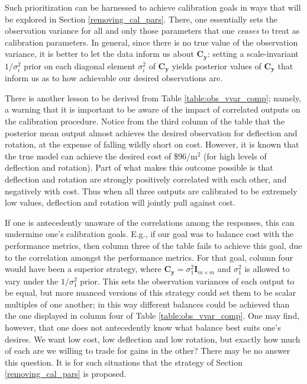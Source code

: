 \documentclass{article}
\begin{document}
Such prioritization can be harnessed to achieve calibration goals in ways that will be explored in Section \ref{removing_cal_pars}. There, one essentially sets the observation variance for all and only those parameters that one \emph{ceases} to treat as calibration parameters. In general, since there is no true value of the observation variance, it is better to let the data inform us about $\mathbf C_{\mathbf y}$: setting a scale-invariant $1/\sigma_i^2$ prior on each diagonal element $\sigma_i^2$ of $\mathbf C_{\mathbf y}$ yields posterior values of $\mathbf C_{\mathbf y}$ that inform us as to how achievable our desired observations are.

There is another lesson to be derived from Table \ref{table:obs_vvar_comp}; namely, a warning that it is important to be aware of the impact of correlated outputs on the calibration procedure. Notice from the third column of the table that the posterior mean output almost achieves the desired observation for deflection and rotation, at the expense of falling wildly short on cost. However, it is known that the true model can achieve the desired cost of \$96/m$^2$ (for high levels of deflection and rotation). Part of what makes this outcome possible is that deflection and rotation are strongly positively correlated with each other, and negatively with cost. Thus when all three outputs are calibrated to be extremely low values, deflection and rotation will jointly pull against cost.

If one is antecedently unaware of the correlations among the responses, this can undermine one's calibration goals. E.g., if our goal was to balance cost with the performance metrics, then column three of the table fails to achieve this goal, due to the correlation amongst the performance metrics. For that goal, column four would have been a superior strategy, where $\mathbf C_{\mathbf y} = \sigma^2_1 \mathbf I_{m\times m}$ and $\sigma^2_1$ is allowed to vary under the $1/\sigma^2_1$ prior. This sets the observation variances of each output to be equal, but more nuanced versions of this strategy could set them to be scalar multiples of one another; in this way different balances could be achieved than the one displayed in column four of Table \ref{table:obs_vvar_comp}. One may find, however, that one does not antecedently know what balance best suits one's desires. We want low cost, low deflection and low rotation, but exactly how much of each are we willing to trade for gains in the other? There may be no answer this question. It is for such situations that the strategy of Section \ref{removing_cal_pars} is proposed.
\end{document}
